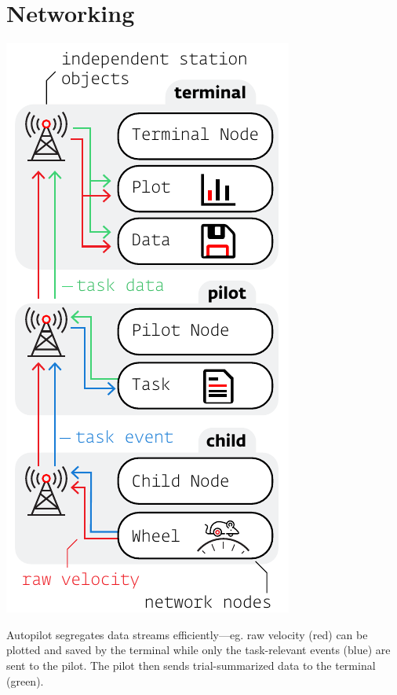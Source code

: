 \documentclass[nohyper, justified, notitlepage, marginals=raggedright,twoside=false,debug]{tufte-autopilot}
\begin{document}
\clearpage


\section{Networking}
\label{sec:networking}

\begin{marginfigure}[0.8cm]
\includegraphics[]{figures/side_24_networking.pdf}
\caption{Autopilot segregates data streams efficiently---eg. raw velocity (red) can be plotted and saved by the terminal while only the task-relevant events (blue) are sent to the pilot. The pilot then sends trial-summarized data to the terminal (green).}
\label{fig:datastreams}
\end{marginfigure}
\end{document}
